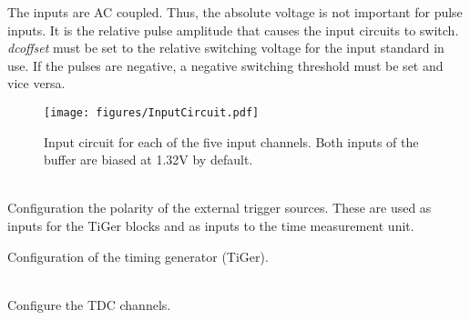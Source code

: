 			 \noindent The inputs are AC coupled. Thus, the absolute voltage is not important for pulse inputs. It is the relative pulse amplitude that causes the input circuits to switch. \textit{dc\tu offset} must be set to the relative switching voltage for the input standard in use. If the pulses are negative, a negative switching threshold must be set and vice versa.
			\begin{figure}
				\begin{center}
					\texttt{[image: figures/InputCircuit.pdf]}
					\caption{Input circuit for each of the five input channels. Both inputs of the buffer are biased at 1.32V by default.\label{fig:dcoffset1}}
				\end{center}
			\end{figure}

			\\
			Configuration the polarity of the external trigger sources.
			These are used as inputs for the TiGer blocks and as inputs to the time measurement unit.\par

			Configuration of the timing generator (TiGer).

			\\
				Configure the TDC channels.

			\\
			\par

